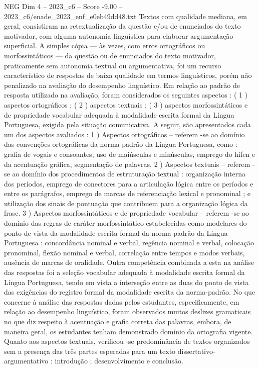 \begin{textsample}{NEG Dim 4 – 2023\_c6 – Score -9.00 – 2023\_c6/enade\_2023\_enf\_e0eb49dd48.txt}
Textos com qualidade mediana, em geral, consistiram na retextualização da questão e/ou de enunciados do texto motivador, com alguma autonomia linguística para elaborar argumentação superficial.
A simples cópia — às vezes, com erros ortográficos ou morfossintáticos — da questão ou de enunciados do texto motivador, praticamente sem autonomia textual ou argumentativa, foi um recurso característico de respostas de baixa qualidade em termos linguísticos, porém não penalizado na avaliação do desempenho linguístico.
Em relação ao padrão de resposta utilizado na avaliação, foram considerados os seguintes aspectos : ( 1 ) aspectos ortográficos ; ( 2 ) aspectos textuais ; ( 3 ) aspectos morfossintáticos e de propriedade vocabular adequada à modalidade escrita formal da Língua Portuguesa, exigida pela situação comunicativa.
A seguir, são apresentados cada um dos aspectos avaliados : 1 ) Aspectos ortográficos – referem -se ao domínio das convenções ortográficas da norma-padrão da Língua Portuguesa, como : grafia de vogais e consoantes, uso de maiúsculas e minúsculas, emprego do hífen e da acentuação gráfica, segmentação de palavras. 2 ) Aspectos textuais – referem -se ao domínio dos procedimentos de estruturação textual : organização interna dos períodos, emprego de conectores para a articulação lógica entre os períodos e entre os parágrafos, emprego de marcas de referenciação lexical e pronominal ; e utilização dos sinais de pontuação que contribuem para a organização lógica da frase. 3 ) Aspectos morfossintáticos e de propriedade vocabular – referem -se ao domínio das regras de caráter morfossintático estabelecidas como modelares do ponto de vista da modalidade escrita formal da norma-padrão da Língua Portuguesa : concordância nominal e verbal, regência nominal e verbal, colocação pronominal, flexão nominal e verbal, correlação entre tempos e modos verbais, ausência de marcas de oralidade.
Outra competência combinada a esta na análise das respostas foi a seleção vocabular adequada à modalidade escrita formal da Língua Portuguesa, tendo em vista a interseção entre as duas do ponto de vista das exigências do registro formal da modalidade escrita da norma-padrão.
No que concerne à análise das respostas dadas pelos estudantes, especificamente, em relação ao desempenho linguístico, foram observados muitos deslizes gramaticais no que diz respeito à acentuação e grafia correta das palavras, embora, de maneira geral, os estudantes tenham demonstrado domínio da ortografia vigente.
Quanto aos aspectos textuais, verificou -se predominância de textos organizados sem a presença das três partes esperadas para um texto dissertativo-argumentativo : introdução ; desenvolvimento e conclusão.

\end{textsample}

